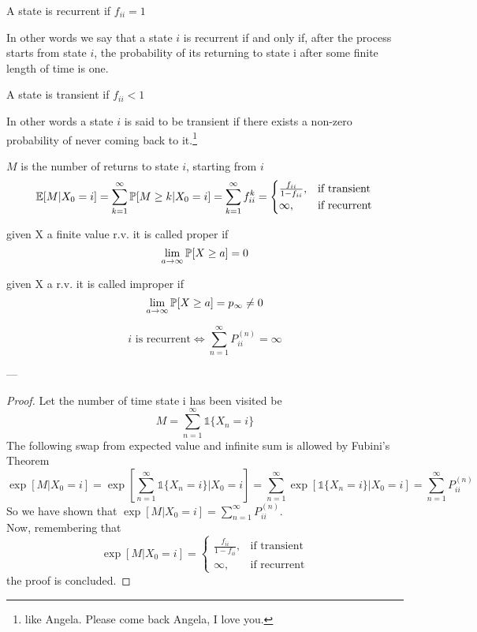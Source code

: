 	\begin{definition}
		A state is recurrent if $f_{ii} = 1$
	\end{definition}
	In other words we say that a state $i$ is recurrent if and only if, after the process starts from state $i$, the probability of its returning to state i after some finite length of time is one.

	\begin{definition}
		A state is transient if  $f_{ii} < 1$
	\end{definition}

	In other words a state $i$ is said to be transient if there exists a non-zero probability of never coming back to it.\footnote{like Angela. Please come back Angela, I love you.}

	\begin{definition}
		$M$ is the number of returns to state $i$, starting from $i$
		$$\mathbb{E}[M | X_0 = i] = \sum\limits_{k=1}^\infty \mathbb{P}[M\geq k | X_0 = i] = \sum\limits_{k=1}^\infty f_{ii}^k = \begin{cases}
		\frac{f_{ii}}{1-f_{ii}}, & \text{if transient} \\
		\infty, & \text{if recurrent}
		\end{cases}$$
	\end{definition}

	\begin{definition}[Proper r.v]
		given X a finite value r.v. it is called proper if $$\lim_{a\to \infty} \mathbb{P}[X\geq a] = 0$$
	\end{definition}

	\begin{definition}[Improper r.v]
		given X a r.v. it is called improper if  $$\lim_{a\to \infty} \mathbb{P}[X\geq a] = p_\infty \ne 0$$
	\end{definition}

	\begin{theorem}
		$$i  \text{ is recurrent} \iff \sum\limits_{n=1}^\infty P_{ii}^{(n)} = \infty$$
	\end{theorem}
	---

	\begin{proof}
		Let the number of time state i has been visited be $$M = \sum\limits_{n=1}^\infty \mathds{1}\{X_n =i\} $$
		The following swap from expected value and infinite sum is allowed by Fubini's Theorem
		$$
			\exp[M | X_0 = i] = \exp\left[\sum\limits_{n=1}^\infty \mathds{1}\{X_n = i\} | X_0 = i\right]
			= \sum\limits_{n=1}^\infty \exp\left[\mathds{1}\{ X_n = i\} | X_0 = i\right] = \sum\limits_{n=1}^\infty P_{ii}^{(n)}
		$$
		So we have shown that $\exp[M | X_0=i] = \sum\limits_{n=1}^\infty P_{ii}^{(n)}$.\\
		Now, remembering that $$ \exp[M | X_0 = i] = \begin{cases}
		\frac{f_{ii}}{1-f_{ii}}, & \text{if transient} \\
		\infty, & \text{if recurrent}
		\end{cases}$$
		the proof is concluded.
	\end{proof}

